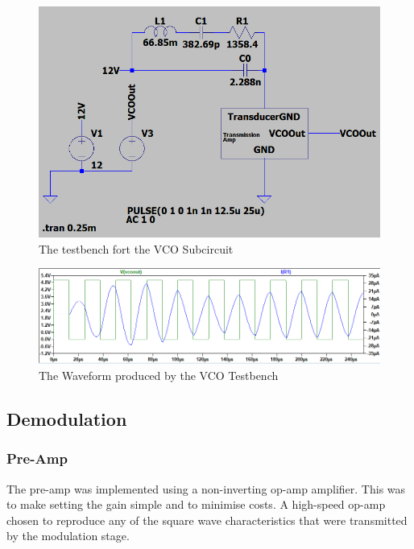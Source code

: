\begin{figure}[H]
    \centering 
    \includegraphics[width=\textwidth]{../Circuits/Images/TransmissionAmp/TestBenchScreencap}
    \caption{The testbench fort the VCO Subcircuit}
    \label{fig:TransmissionAmpTestBench}
\end{figure}

\begin{figure}[H]
    \centering 
    \includegraphics[width=\textwidth]{../Circuits/Images/TransmissionAmp/TestBenchWaveform}
    \caption{The Waveform produced by the VCO Testbench}
    \label{fig:TransmissionAmpTestBenchWaveform}
\end{figure}

\subsection{Demodulation}

\subsubsection{Pre-Amp}
The pre-amp was implemented using a non-inverting op-amp amplifier. 
This was to make setting the gain simple and to minimise costs. 
A high-speed op-amp chosen to reproduce any of the square wave characteristics that were transmitted by the modulation stage.

